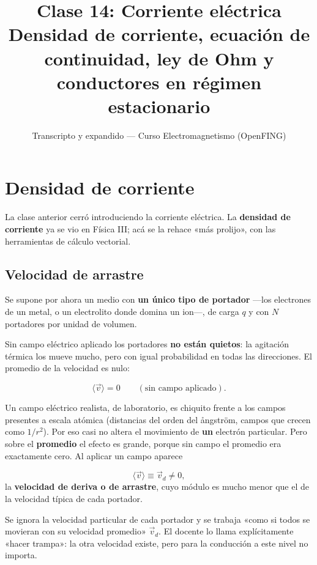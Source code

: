 \documentclass[12pt,a4paper]{article}
\title{\textbf{Clase 14: Corriente eléctrica} \\[0.3em]
        \large{Densidad de corriente, ecuación de continuidad, ley de Ohm y conductores en régimen estacionario}}
\author{Transcripto y expandido --- Curso Electromagnetismo (OpenFING)}
\date{}
\begin{document}
\maketitle
\thispagestyle{empty}
\newpage

\tableofcontents
\newpage

\section{Densidad de corriente}

La clase anterior cerró introduciendo la corriente eléctrica. La \textbf{densidad de
corriente} ya se vio en Física III; acá se la rehace «más prolijo», con las
herramientas de cálculo vectorial.

\subsection{Velocidad de arrastre}

Se supone por ahora un medio con \textbf{un único tipo de portador} ---los electrones
de un metal, o un electrolito donde domina un ion---, de carga $q$ y con $N$
portadores por unidad de volumen.

Sin campo eléctrico aplicado los portadores \textbf{no están quietos}: la agitación
térmica los mueve mucho, pero con igual probabilidad en todas las direcciones.
El promedio de la velocidad es nulo:

\[
\langle \vec v\rangle = 0 \qquad (\text{sin campo aplicado}).
\]

Un campo eléctrico realista, de laboratorio, es chiquito frente a los campos
presentes a escala atómica (distancias del orden del ångström, campos que
crecen como $1/r^2$). Por eso casi no altera el movimiento de \textbf{un} electrón
particular. Pero sobre el \textbf{promedio} el efecto es grande, porque sin campo el
promedio era exactamente cero. Al aplicar un campo aparece

\[
\langle \vec v\rangle \equiv \vec v_d \neq 0,
\]
la \textbf{velocidad de deriva o de arrastre}, cuyo módulo es mucho menor que el de
la velocidad típica de cada portador.

\begin{notebox}
Se ignora la velocidad particular de cada
portador y se trabaja «como si todos se movieran con su velocidad promedio»
$\vec v_d$. El docente lo llama explícitamente «hacer trampa»: la otra
velocidad existe, pero para la conducción a este nivel no importa.
\end{notebox}
\end{document}
